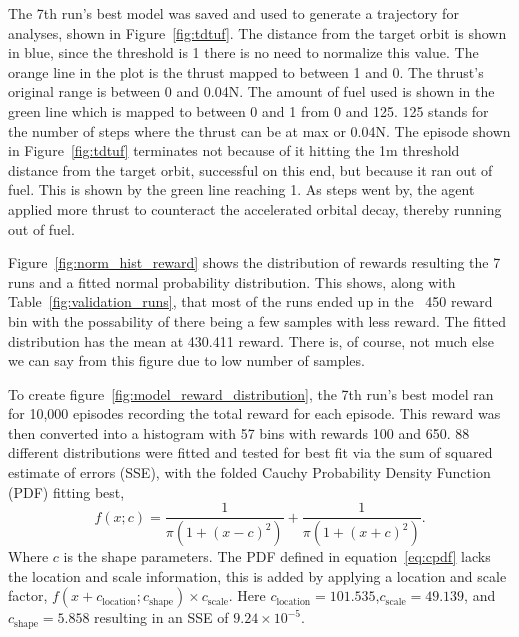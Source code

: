 The 7th run's best model was saved and used to generate a trajectory for analyses, shown in Figure~\ref{fig:tdtuf}. The distance from the target orbit is shown in blue, since the threshold is 1 there is no need to normalize this value. The orange line in the plot is the thrust mapped to between 1 and 0. The thrust's original range is between 0 and 0.04\si{N}. The amount of fuel used is shown in the green line which is mapped to between 0 and 1 from 0 and 125. 125 stands for the number of steps where the thrust can be at max or 0.04\si{N}. The episode shown in Figure~\ref{fig:tdtuf} terminates not because of it hitting the 1\si{m} threshold distance from the target orbit, successful on this end, but because it ran out of fuel. This is shown by the green line reaching 1. As steps went by, the agent applied more thrust to counteract the accelerated orbital decay, thereby running out of fuel.

Figure~\ref{fig:norm_hist_reward} shows the distribution of rewards resulting the 7 runs and a fitted normal probability distribution. This shows, along with Table~\ref{fig:validation_runs}, that most of the runs ended up in the ~450 reward bin with the possability of there being a few samples with less reward. The fitted distribution has the mean at 430.411 reward. There is, of course, not much else we can say from this figure due to low number of samples. 

To create figure~\ref{fig:model_reward_distribution}, the 7th run's best model ran for 10,000 episodes recording the total reward for each episode. This reward was then converted into a histogram with 57 bins with rewards 100 and 650. 88 different distributions were fitted and tested for best fit via the sum of squared estimate of errors (SSE), with the folded Cauchy Probability Density Function (PDF) fitting best, 
\begin{equation}\label{eq:cpdf}
	f(x;c)=\frac{1}{\pi(1+(x-c)^2)}+\frac{1}{\pi(1+(x+c)^2)}.
\end{equation} 
Where $c$ is the shape parameters. The PDF defined in equation~\ref{eq:cpdf} lacks the location and scale information, this is added by applying a location and scale factor, $f(x+c_{\text{location}};c_{\text{shape}})\times c_{\text{scale}}$. Here $c_{\text{location}}=101.535$,$c_{\text{scale}}=49.139$, and $c_{\text{shape}}=5.858$ resulting in an SSE of $9.24\times 10^{-5}$.

